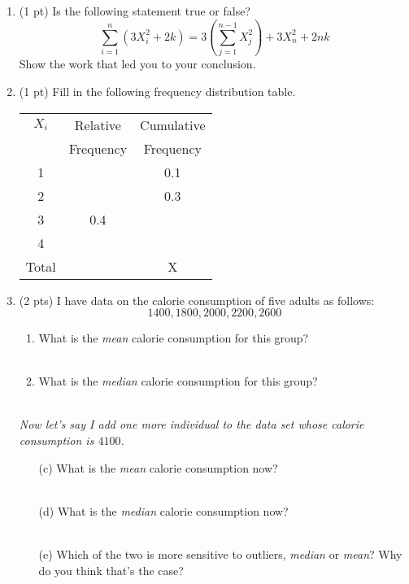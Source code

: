 \documentclass{./../../Latex/handout}
\begin{document}
\thispagestyle{plain}

\begin{enumerate}
\setlength\itemsep{2em}
\item (1 pt) Is the following statement true or false?   $$ \sum_{i=1}^n (3X_i^2 + 2k) = 3 \left(\sum_{j=1}^{n-1}X^2_j \right) + 3 X^2_n + 2nk $$ 
Show the work that led you to your conclusion.
\vspace{4cm}

\item (1 pt) Fill in the following frequency distribution table.  

\begin{center}
\begin{tabular}{|c|c|c|}
\hline
$X_i$ & Relative & Cumulative \\
& Frequency & Frequency \\
\hline
1 & & 0.1 \\
\hline
2 & & 0.3 \\
\hline
3 & 0.4 &  \\
\hline
4 & & \\
\hline
Total & & X \\
\hline
\end{tabular}
\end{center}

\newpage
\item (2 pts) I have data on the calorie consumption of five adults as follows:  
$$ 1400, 1800, 2000, 2200, 2600 $$
\begin{enumerate}
\item What is the \textit{mean} calorie consumption for this group? \\~\\
\item What is the \textit{median} calorie consumption for this group? \\~\\
\end{enumerate}
\textit{Now let's say I add one more individual to the data set whose calorie consumption is $4100$.}
\begin{enumerate}
\item[(c)] What is the \textit{mean} calorie consumption now? \\~\\
\item[(d)]  What is the \textit{median} calorie consumption now? \\~\\
\item[(e)] Which of the two is more sensitive to outliers, \textit{median} or \textit{mean}? Why do you think that's the case? \\~\\
\end{enumerate}


\end{enumerate}
\end{document}
